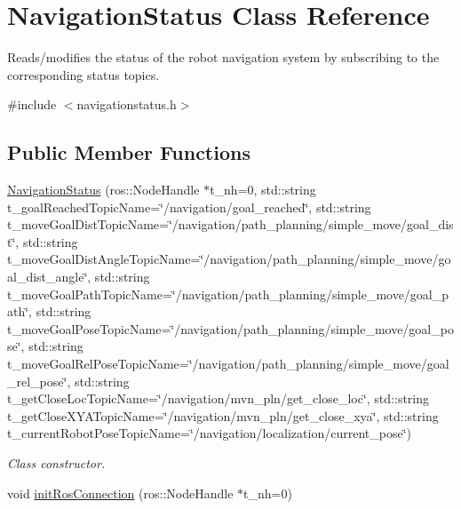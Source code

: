 \hypertarget{class_navigation_status}{}\section{Navigation\+Status Class Reference}
\label{class_navigation_status}


Reads/modifies the status of the robot navigation system by subscribing to the corresponding status topics.  




{\ttfamily \#include $<$navigationstatus.\+h$>$}

\subsection*{Public Member Functions}
\begin{DoxyCompactItemize}
\item 
\hyperlink{class_navigation_status_aeb7c5af6d198e22e7c9f8504e821cf8d}{Navigation\+Status} (ros\+::\+Node\+Handle $\ast$t\+\_\+nh=0, std\+::string t\+\_\+goal\+Reached\+Topic\+Name=\char`\"{}/navigation/goal\+\_\+reached\char`\"{}, std\+::string t\+\_\+move\+Goal\+Dist\+Topic\+Name=\char`\"{}/navigation/path\+\_\+planning/simple\+\_\+move/goal\+\_\+dist\char`\"{}, std\+::string t\+\_\+move\+Goal\+Dist\+Angle\+Topic\+Name=\char`\"{}/navigation/path\+\_\+planning/simple\+\_\+move/goal\+\_\+dist\+\_\+angle\char`\"{}, std\+::string t\+\_\+move\+Goal\+Path\+Topic\+Name=\char`\"{}/navigation/path\+\_\+planning/simple\+\_\+move/goal\+\_\+path\char`\"{}, std\+::string t\+\_\+move\+Goal\+Pose\+Topic\+Name=\char`\"{}/navigation/path\+\_\+planning/simple\+\_\+move/goal\+\_\+pose\char`\"{}, std\+::string t\+\_\+move\+Goal\+Rel\+Pose\+Topic\+Name=\char`\"{}/navigation/path\+\_\+planning/simple\+\_\+move/goal\+\_\+rel\+\_\+pose\char`\"{}, std\+::string t\+\_\+get\+Close\+Loc\+Topic\+Name=\char`\"{}/navigation/mvn\+\_\+pln/get\+\_\+close\+\_\+loc\char`\"{}, std\+::string t\+\_\+get\+Close\+X\+Y\+A\+Topic\+Name=\char`\"{}/navigation/mvn\+\_\+pln/get\+\_\+close\+\_\+xya\char`\"{}, std\+::string t\+\_\+current\+Robot\+Pose\+Topic\+Name=\char`\"{}/navigation/localization/current\+\_\+pose\char`\"{})
\begin{DoxyCompactList}\small\item\em Class constructor. \end{DoxyCompactList}\item 
void \hyperlink{class_navigation_status_aef2ebb49eddf679a58368f3aeda55031}{init\+Ros\+Connection} (ros\+::\+Node\+Handle $\ast$t\+\_\+nh=0)

\end{DoxyCompactItemize}
